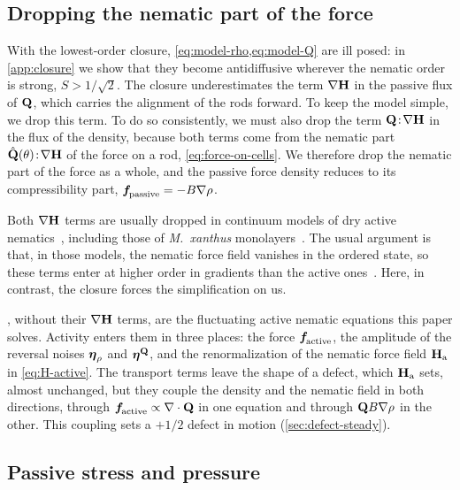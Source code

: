 \documentclass[aps,pre,reprint,superscriptaddress,longbibliography,nofootinbib
]{revtex4-2}
\begin{document}
\subsection{Dropping the nematic part of the force}
\label{sec:model-elastic}

With the lowest-order closure,
\cref{eq:model-rho,eq:model-Q} are ill posed: in
\cref{app:closure} we show that they become antidiffusive
wherever the nematic order is strong, $S>1/\sqrt2$. The
closure underestimates the term $\nabla\mathbf{H}$ in the passive
flux of $\mathbf{Q}$, which carries the alignment of the rods
forward. To keep the model simple, we drop this term. To do
so consistently, we must also drop the term
$\mathbf{Q}\!:\!\nabla\mathbf{H}$ in the flux of the density, because both
terms come from the nematic part
$\hat{\mathbf{Q}}(\theta)\!:\!\nabla\mathbf{H}$ of the force on a rod,
\cref{eq:force-on-cells}. We therefore drop the nematic
part of the force as a whole, and the passive force density
reduces to its compressibility part, $\boldsymbol{f}_\text{\!passive}=-B\nabla\rho$.

Both $\nabla\mathbf{H}$ terms are usually dropped in continuum
models of dry active
nematics~\cite{ramaswamy2003active,bertin2013,
mishra2010dynamic,ngo2014large,putzig2014phase,
shankar2018low}, including those of \textit{M.\ xanthus}
monolayers~\cite{copenhagen2021,han2025local}. The usual
argument is that, in those models, the nematic force field
vanishes in the ordered state, so these terms enter at
higher order in gradients than the active
ones~\cite{shankar2018low,srivastava2016negative}. Here, in
contrast, the closure forces the simplification on us.


\par

, without their $\nabla\mathbf{H}$
terms, are the fluctuating active nematic equations this
paper solves. Activity enters them in three places: the
force $\boldsymbol{f}_\text{\!active}$, the amplitude of the reversal noises
$\boldsymbol\eta_\rho$ and $\boldsymbol\eta^{\mathbf{Q}}$, and the renormalization of the
nematic force field $\mathbf{H}_\text{a}$ in \cref{eq:H-active}. The
transport terms leave the shape of a defect, which $\mathbf{H}_\text{a}$
sets, almost unchanged, but they couple the density and the
nematic field in both directions, through
$\boldsymbol{f}_\text{\!active}\propto\nabla\cdot\mathbf{Q}$ in one equation and through $\mathbf{Q}
B\nabla\rho$ in the other. This coupling sets a $+1/2$
defect in motion (\cref{sec:defect-steady}).

\subsection{Passive stress and pressure}
\label{sec:pressure}
\end{document}
